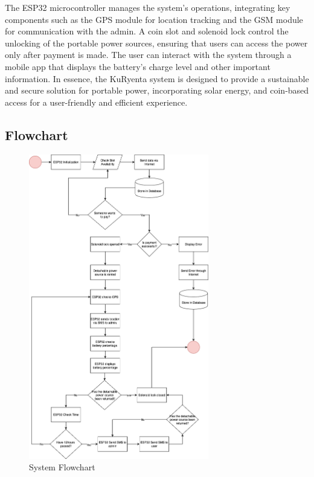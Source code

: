 {The ESP32 microcontroller manages the system's operations, integrating key components such as the GPS module for location tracking and the GSM module for communication with the admin. A coin slot and solenoid lock control the unlocking of the portable power sources, ensuring that users can access the power only after payment is made. The user can interact with the system through a mobile app that displays the battery's charge level and other important information. In essence, the KuRyenta system is designed to provide a sustainable and secure solution for portable power, incorporating solar energy, and coin-based access for a user-friendly and efficient experience.


\subsection{Flowchart}
\begin{figure}[H]
	\centering
	\caption{System Flowchart}
	\label{fig:flowchart}
	\includegraphics[width=0.7\textwidth]{figures/flowchart.png}
\end{figure}

}
